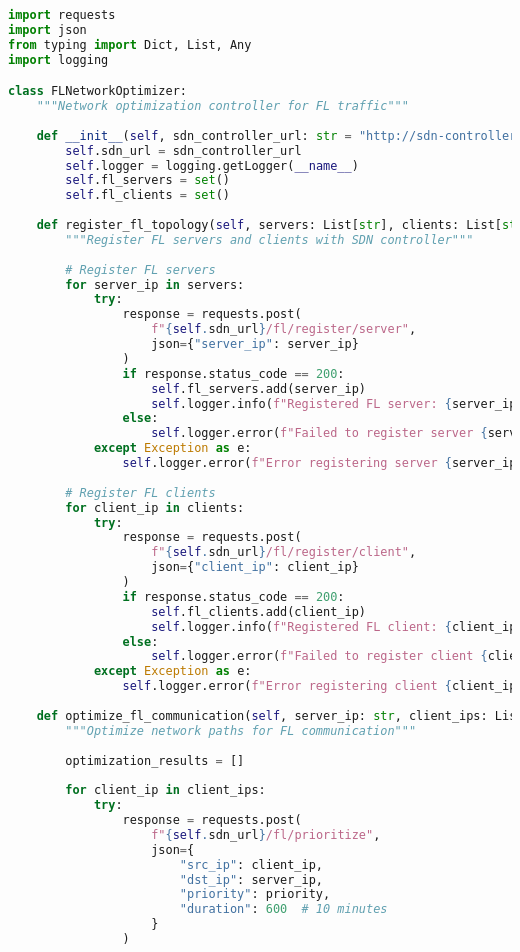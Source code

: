 \begin{lstlisting}[language=python, caption=SDN Controller Integration]
import requests
import json
from typing import Dict, List, Any
import logging

class FLNetworkOptimizer:
    """Network optimization controller for FL traffic"""
    
    def __init__(self, sdn_controller_url: str = "http://sdn-controller:8181"):
        self.sdn_url = sdn_controller_url
        self.logger = logging.getLogger(__name__)
        self.fl_servers = set()
        self.fl_clients = set()
    
    def register_fl_topology(self, servers: List[str], clients: List[str]):
        """Register FL servers and clients with SDN controller"""
        
        # Register FL servers
        for server_ip in servers:
            try:
                response = requests.post(
                    f"{self.sdn_url}/fl/register/server",
                    json={"server_ip": server_ip}
                )
                if response.status_code == 200:
                    self.fl_servers.add(server_ip)
                    self.logger.info(f"Registered FL server: {server_ip}")
                else:
                    self.logger.error(f"Failed to register server {server_ip}: {response.text}")
            except Exception as e:
                self.logger.error(f"Error registering server {server_ip}: {e}")
        
        # Register FL clients
        for client_ip in clients:
            try:
                response = requests.post(
                    f"{self.sdn_url}/fl/register/client",
                    json={"client_ip": client_ip}
                )
                if response.status_code == 200:
                    self.fl_clients.add(client_ip)
                    self.logger.info(f"Registered FL client: {client_ip}")
                else:
                    self.logger.error(f"Failed to register client {client_ip}: {response.text}")
            except Exception as e:
                self.logger.error(f"Error registering client {client_ip}: {e}")
    
    def optimize_fl_communication(self, server_ip: str, client_ips: List[str], priority: int = 200):
        """Optimize network paths for FL communication"""
        
        optimization_results = []
        
        for client_ip in client_ips:
            try:
                response = requests.post(
                    f"{self.sdn_url}/fl/prioritize",
                    json={
                        "src_ip": client_ip,
                        "dst_ip": server_ip,
                        "priority": priority,
                        "duration": 600  # 10 minutes
                    }
                )
                

\end{lstlisting}
